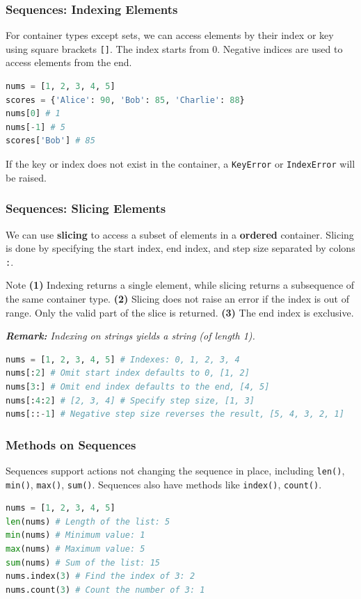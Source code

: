 \documentclass[beamer, en, version=2.0]{huangfusl-template}
\begin{document}
    \begin{frame}[fragile]
        \frametitle{Sequences: Indexing Elements}

        For container types except sets, we can access elements by their index or key using square brackets {\footnotesize\verb|[]|}. {\color{darkred}The index starts from 0}. Negative indices are used to access elements from the end.

\begin{lstlisting}[language=python]
nums = [1, 2, 3, 4, 5]
scores = {'Alice': 90, 'Bob': 85, 'Charlie': 88}
nums[0] # 1
nums[-1] # 5
scores['Bob'] # 85
\end{lstlisting}

    If the key or index does not exist in the container, a {\footnotesize\verb|KeyError|} or {\footnotesize\verb|IndexError|} will be raised.

    \end{frame}
    \begin{frame}[fragile]
        \frametitle{Sequences: Slicing Elements}

        We can use \textbf{slicing} to access a subset of elements in a \textbf{ordered} container. Slicing is done by specifying the start index, end index, and step size separated by colons {\footnotesize\verb|:|}.

        \begin{block}{Note}
            \textbf{(1)} Indexing returns a single element, while slicing returns a subsequence of the same container type. \textbf{(2)} Slicing does not raise an error if the index is out of range. Only the valid part of the slice is returned. \textbf{(3)} The end index is exclusive.

            {\footnotesize\itshape\textbf{Remark:} Indexing on strings yields a string (of length 1).}
        \end{block}

\begin{lstlisting}[language=python]
nums = [1, 2, 3, 4, 5] # Indexes: 0, 1, 2, 3, 4
nums[:2] # Omit start index defaults to 0, [1, 2]
nums[3:] # Omit end index defaults to the end, [4, 5]
nums[:4:2] # [2, 3, 4] # Specify step size, [1, 3]
nums[::-1] # Negative step size reverses the result, [5, 4, 3, 2, 1]
\end{lstlisting}
    \end{frame}
    \begin{frame}[fragile]
        \frametitle{Methods on Sequences}

        Sequences support actions not changing the sequence in place, including {\footnotesize\verb|len()|}, {\footnotesize\verb|min()|}, {\footnotesize\verb|max()|}, {\footnotesize\verb|sum()|}. Sequences also have methods like {\footnotesize\verb|index()|}, {\footnotesize\verb|count()|}.

\begin{lstlisting}[language=python]
nums = [1, 2, 3, 4, 5]
len(nums) # Length of the list: 5
min(nums) # Minimum value: 1
max(nums) # Maximum value: 5
sum(nums) # Sum of the list: 15
nums.index(3) # Find the index of 3: 2
nums.count(3) # Count the number of 3: 1
\end{lstlisting}
    \end{frame}
\end{document}
